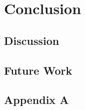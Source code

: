 \documentclass[12pt]{report}
\begin{document}
\chapter{Conclusion}
\label{ch:conclusion}

\section{Discussion}

\section{Future Work}

\pagebreak





\begin{appendices}
\chapter*{Appendix A}
\label{apdx:constraints}

\end{appendices}
\end{document}

